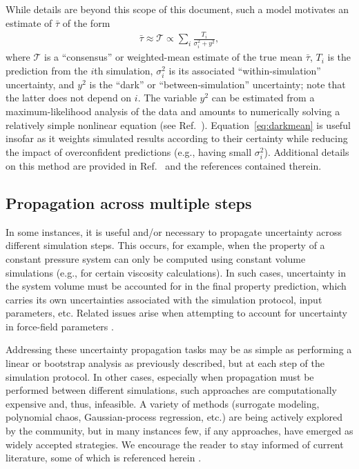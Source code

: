 While details are beyond this scope of this document, such a model motivates an estimate of $\bar \tau$ of the form
\begin{align}
\bar \tau \approx \mathcal T \propto \sum_i \frac{T_i}{\sigma_i^2 + y^2}, \label{eq:darkmean}
\end{align}
where $\mathcal T$ is a ``consensus'' or weighted-mean estimate of the true mean $\bar \tau$, $T_i$ is the prediction from the $i$th simulation, $\sigma_i^2$ is its associated ``within-simulation'' uncertainty, and $y^2$ is the ``dark'' or ``between-simulation'' uncertainty; note that the latter does not depend on $i$.  The variable $y^2$ can be estimated from a maximum-likelihood analysis of the data and amounts to numerically solving a relatively simple nonlinear equation (see Ref.~\cite{patrone1}).  Equation~\ref{eq:darkmean} is useful insofar as it weights simulated results according to their certainty while reducing the impact of overconfident predictions (e.g., having small $\sigma_i^2$).  Additional details on this method are provided in Ref.~\cite{patrone1} and the references contained therein.

\subsection{Propagation across multiple steps}
In some instances, it is useful and/or necessary to propagate uncertainty across different simulation steps.  This occurs, for example, when the property of a constant pressure system can only be computed using constant volume simulations (e.g., for certain viscosity calculations).  In such cases, uncertainty in the system volume must be accounted for in the final property prediction, which carries its own uncertainties associated with the simulation protocol, input parameters, etc.  Related issues arise when attempting to account for uncertainty in force-field parameters \cite{Rizzi2,Rizzi3,Rizzi4}.

Addressing these uncertainty propagation tasks may be as simple as performing a linear or bootstrap analysis as previously described, but at each step of the simulation protocol.  In other cases, especially when propagation must be performed between different simulations, such approaches are computationally expensive and, thus, infeasible.  A variety of methods (surrogate modeling, polynomial chaos, Gaussian-process regression, etc.) are being actively explored by the community, but in many instances few, if any approaches, have emerged as widely accepted strategies.  We encourage the reader to stay informed of current literature, some of which is referenced herein \cite{smith2013uncertainty}.
